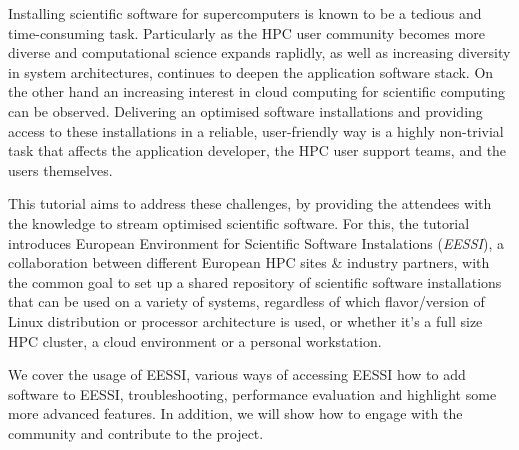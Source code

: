 Installing scientific software for supercomputers is known to be a tedious and time-consuming task. Particularly as the 
HPC user community becomes more diverse and computational science expands raplidly, as well as increasing diversity in 
system architectures, continues to deepen the application software stack. On the other hand an increasing interest in 
cloud computing for scientific computing can be observed. Delivering an optimised software installations and providing 
access to these installations in a reliable, user-friendly way is a highly non-trivial task that affects the application 
developer, the HPC user support teams, and the users themselves.

This tutorial aims to address these challenges, by providing the attendees with the knowledge to stream optimised scientific 
software. For this, the tutorial introduces European Environment for Scientific Software Instalations (\emph{EESSI}), a 
collaboration between different European HPC sites & industry partners, with the common goal to set up a shared 
repository of scientific software installations that can be used on a variety of systems, regardless of which 
flavor/version of Linux distribution or processor architecture is used, or whether it’s a full size HPC cluster, a cloud 
environment or a personal workstation.

We cover the usage of EESSI, various ways of accessing EESSI how to add software to EESSI, troubleshooting, performance 
evaluation  and highlight some more advanced features. In addition, we will show how to engage with the community and 
contribute to the project.
